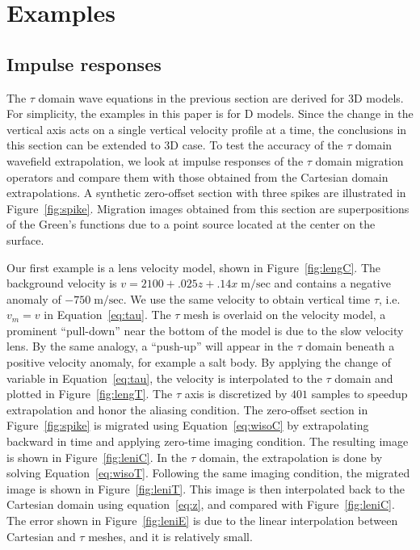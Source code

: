 \section{Examples}

\subsection{Impulse responses}

The $\tau$ domain wave equations in the previous section are derived for 3D models. For simplicity, the examples in this paper is for D models. 
Since the change in the vertical axis acts on a single vertical velocity profile at a time, the conclusions in this section can be extended to 3D case.
To test the accuracy of the $\tau$ domain wavefield extrapolation, we look at impulse responses of the $\tau$ domain migration operators and compare them 
with those obtained from the Cartesian domain extrapolations. A synthetic zero-offset section with three spikes are illustrated in Figure~\ref{fig:spike}.
Migration images obtained from this section are superpositions of the Green's functions due to a point source located at the center on the surface.


Our first example is a lens velocity model, shown in Figure~\ref{fig:lengC}.
 The background velocity is $v = 2100 + .025z + .14x \; \mathrm{m/sec}$ and contains a negative anomaly of $-750 \; \mathrm{m/sec}$. We use the same velocity to obtain vertical time $\tau$, i.e. $v_m = v$ in Equation~\ref{eq:tau}. The $\tau$ mesh is overlaid on the velocity model, a prominent ``pull-down'' near the bottom of the model is due to the slow velocity lens. By the same analogy, a ``push-up'' will appear in the $\tau$ domain beneath a positive velocity anomaly, for example a salt body. By applying the change of variable in Equation~\ref{eq:tau}, the velocity is interpolated to the $\tau$ domain and plotted in Figure~\ref{fig:lengT}.
The $\tau$ axis is discretized by $401$ samples to speedup extrapolation and honor the aliasing condition.
The zero-offset section in Figure~\ref{fig:spike} is migrated using Equation~\ref{eq:wisoC} by extrapolating backward in time and applying zero-time imaging condition. The resulting image is shown in Figure~\ref{fig:leniC}. 
In the $\tau$ domain, the extrapolation is done by solving Equation~\ref{eq:wisoT}. Following the same imaging condition, the migrated image is shown in Figure~\ref{fig:leniT}.
This image is then interpolated back to the Cartesian domain using equation~\ref{eq:z}, and compared with Figure~\ref{fig:leniC}.
The error shown in Figure~\ref{fig:leniE}
is due to the linear interpolation between Cartesian and $\tau$ meshes, and it is relatively small.

